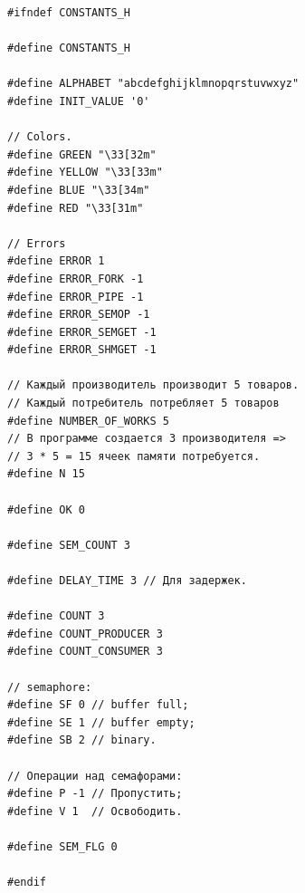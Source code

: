 \begin{lstlisting}[label=some-code,caption=Файл с константами]
#ifndef CONSTANTS_H

#define CONSTANTS_H

#define ALPHABET "abcdefghijklmnopqrstuvwxyz"
#define INIT_VALUE '0'

// Colors.
#define GREEN "\33[32m"
#define YELLOW "\33[33m"
#define BLUE "\33[34m"
#define RED "\33[31m"

// Errors
#define ERROR 1
#define ERROR_FORK -1
#define ERROR_PIPE -1
#define ERROR_SEMOP -1
#define ERROR_SEMGET -1
#define ERROR_SHMGET -1

// Каждый производитель производит 5 товаров.
// Каждый потребитель потребляет 5 товаров
#define NUMBER_OF_WORKS 5
// В программе создается 3 производителя =>
// 3 * 5 = 15 ячеек памяти потребуется.
#define N 15

#define OK 0

#define SEM_COUNT 3

#define DELAY_TIME 3 // Для задержек.

#define COUNT 3
#define COUNT_PRODUCER 3
#define COUNT_CONSUMER 3

// semaphore:
#define SF 0 // buffer full;
#define SE 1 // buffer empty;
#define SB 2 // binary.

// Операции над семафорами:
#define P -1 // Пропустить;
#define V 1	 // Освободить.

#define SEM_FLG 0

#endif
\end{lstlisting}

\begin{figure}[ht!]
\end{figure}

